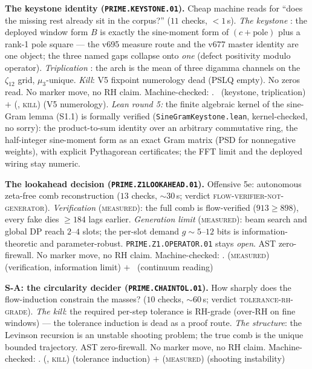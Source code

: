\documentclass[11pt,a4paper]{article}
\theoremstyle{definition}
\begin{document}
\par\smallskip\noindent\textbf{The keystone identity
(\texttt{PRIME.KEYSTONE.01}).}
Cheap machine reads for ``does the missing rest already sit in the
corpus?'' ($11$ checks, ${<}1$\,s).  \emph{The keystone} \mE: the
deployed window form $B$ is exactly the sine-moment form of
$(c+\mathrm{pole})$ plus a rank-1 pole square --- the v695 measure
route and the v677 master identity are one object; the three named
gaps collapse onto \emph{one} (defect positivity modulo operator).
\emph{Triplication} \mE: the arch is the mean of three digamma
channels on the $\zeta_{12}$ grid, $\mu_3$-unique.  \emph{Kill}: V5
fixpoint numerology dead (PSLQ empty).  No zeros read.  No marker
move, no RH claim.
Machine-checked: .
\mE\ (keystone, triplication) $+$ (\mE, \textsc{kill}) (V5
numerology).
\emph{Lean round 5:} the finite algebraic kernel of the sine-Gram
lemma (S1.1) is formally verified
(\texttt{SineGramKeystone.lean}, kernel-checked, no sorry): the
product-to-sum identity over an arbitrary commutative ring, the
half-integer sine-moment form as an exact Gram matrix (PSD for
nonnegative weights), with explicit Pythagorean certificates; the
FFT limit and the deployed wiring stay numeric.
\par\smallskip

\par\smallskip\noindent\textbf{The lookahead decision
(\texttt{PRIME.Z1LOOKAHEAD.01}).}
Offensive 5e: autonomous zeta-free comb reconstruction ($13$ checks,
${\sim}30$\,s; verdict \textsc{flow-verifier-not-generator}).
\emph{Verification} (\textsc{measured}): the full comb is
flow-verified ($913\ge898$), every fake dies $\ge184$ lags earlier.
\emph{Generation limit} (\textsc{measured}): beam search and global
DP reach $2$--$4$ slots; the per-slot demand $g\sim5$--$12$ bits is
information-theoretic and parameter-robust.
\texttt{PRIME.Z1.OPERATOR.01} stays \emph{open}.  AST zero-firewall.
No marker move, no RH claim.
Machine-checked: .
(\textsc{measured}) (verification, information limit) $+$ \mO\
(continuum reading)
\par\smallskip

\par\smallskip\noindent\textbf{S-A: the circularity decider
(\texttt{PRIME.CHAINTOL.01}).}
How sharply does the flow-induction constrain the masses? ($10$
checks, ${\sim}60$\,s; verdict \textsc{tolerance-rh-grade}).
\emph{The kill}: the required per-step tolerance is RH-grade
(over-RH on fine windows) --- the tolerance induction is dead as a
proof route.  \emph{The structure}: the Levinson recursion is an
unstable shooting problem; the true comb is the unique bounded
trajectory.  AST zero-firewall.  No marker move, no RH claim.
Machine-checked: .
(\mE, \textsc{kill}) (tolerance induction) $+$ (\textsc{measured})
(shooting instability)
\par\smallskip
\end{document}
